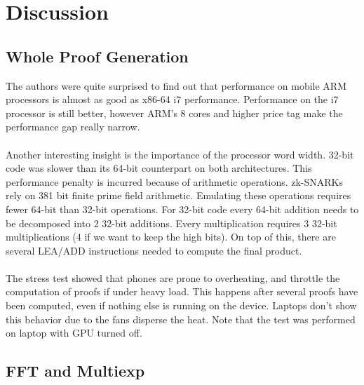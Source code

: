 
\chapter{Discussion} %

\label{Chapter7} %


\section{Whole Proof Generation}
\label{wholeproof}

The authors were quite surprised to find out that performance on mobile ARM processors is almost as good as x86-64 i7 performance. Performance on the i7 processor is still better, however ARM's 8 cores and higher price tag make the performance gap really narrow.\\
\\
Another interesting insight is the importance of the processor word width. 32-bit code was slower than its 64-bit counterpart on both architectures. This performance penalty is incurred because of arithmetic operations. zk-SNARKs rely on 381 bit finite prime field arithmetic. Emulating these operations requires fewer 64-bit than 32-bit operations. For 32-bit code every 64-bit addition needs to be decomposed into 2 32-bit additions. Every multiplication requires 3 32-bit multiplications (4 if we want to keep the high bits). On top of this, there are several LEA/ADD instructions needed to compute the final product.\\
\\
The stress test showed that phones are prone to overheating, and throttle the computation of proofs if under heavy load. This happens after several proofs have been computed, even if nothing else is running on the device. Laptops don't show this behavior due to the fans disperse the heat. Note that the test was performed on laptop with GPU turned off.

\section{FFT and Multiexp}

